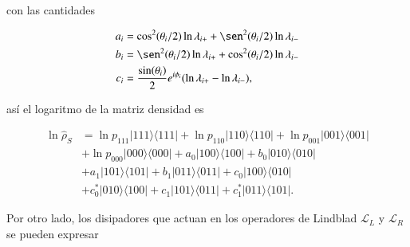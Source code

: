 \begin{appendixs}
con las cantidades 

\begin{align*}
    a_{i} & = \cos^{2}(\theta_{i}/2) \ln \lambda_{i+} + \sen^{2}(\theta_{i}/2) \ln \lambda_{i-} \\
    b_{i} & = \sen^{2}(\theta_{i}/2) \ln \lambda_{i+} + \cos^{2}(\theta_{i}/2) \ln \lambda_{i-}  \\
    c_{i} & = \frac{\sin(\theta_{i})}{2}e^{i\phi_{i}} (\ln \lambda_{i+} - \ln \lambda_{i-}),    
\end{align*}

así el logaritmo de la matriz densidad es 

\begin{align*}
    \ln \hat{\rho}_{S} & = \ln p_{111}|111\rangle \langle 111| + \ln p_{110}|110\rangle \langle 110| + \ln p_{001}|001\rangle \langle 001| \\ 
     & + \ln p_{000}|000\rangle \langle 000| + a_{0}|100\rangle \langle 100| + b_{0}|010\rangle \langle 010|  \\  
     & + a_{1}|101\rangle \langle 101| + b_{1}|011\rangle\langle 011| + c_{0}|100\rangle \langle 010| \\ 
     & + c^{*}_{0}|010\rangle \langle 100| + c_{1}|101\rangle \langle 011| + c^{*}_{1}|011\rangle \langle 101|.
\end{align*}

Por otro lado, los disipadores que actuan en los operadores de Lindblad $\mathcal{L}_{L}$ y $\mathcal{L}_{R}$ se pueden expresar 


\end{appendixs}
